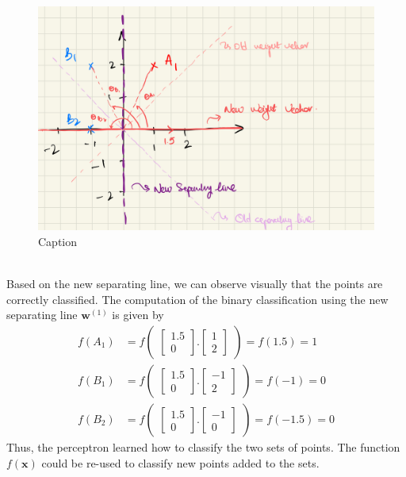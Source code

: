 \begin{figure}[h]
  \centering
  \includegraphics[scale=0.15]{CHAPTER_2/c2_fig_perceptron_example_4.jpeg}
  \caption{Caption}
  \label{fig:perceptron_example_4}
\end{figure} \\
Based on the new separating line, we can observe visually that the points are correctly classified. The computation of the binary classification using the new separating line $\textbf{w}^{(1)}$ is given by
\begin{align}
  f(A_1) &= f\begin{pmatrix}
    \begin{bmatrix}
      1.5\\
      0
    \end{bmatrix}.\begin{bmatrix}
      1 \\
      2
    \end{bmatrix}
  \end{pmatrix} = f(1.5) = 1 \\
  f(B_1) &= f\begin{pmatrix}
    \begin{bmatrix}
      1.5\\
      0
    \end{bmatrix}.\begin{bmatrix}
      -1 \\
      2
    \end{bmatrix}
  \end{pmatrix} = f(-1) = 0 \\
  f(B_2) &= f\begin{pmatrix}
    \begin{bmatrix}
      1.5\\
      0
    \end{bmatrix}.\begin{bmatrix}
      -1 \\
      0
    \end{bmatrix}
  \end{pmatrix} = f(-1.5) = 0
\end{align}
Thus, the perceptron learned how to classify the two sets of points. The function $f(\textbf{x})$ could be re-used to classify new points added to the sets.
